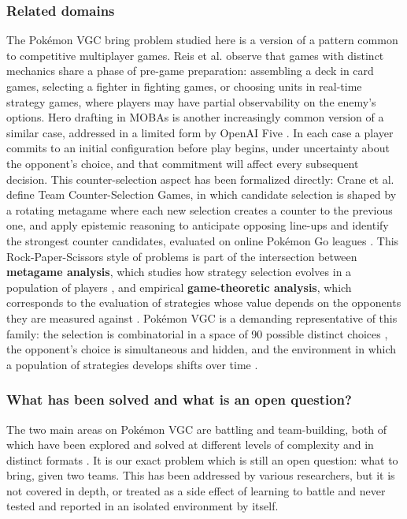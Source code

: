 \documentclass[conference]{IEEEtran}
\begin{document}
\subsubsection{Related domains}
The Pokémon VGC bring problem studied here is a version of a pattern common to
competitive multiplayer games. Reis et al. observe that games with distinct
mechanics share a phase of pre-game preparation: assembling a deck
in card games, selecting a fighter in fighting games, or choosing
units in real-time strategy games, \cite{reis2021} where players may have partial observability on the enemy's options. Hero drafting in MOBAs is another increasingly common version of a similar case, addressed in a limited form by OpenAI Five
\cite{angliss2026}. In each case a player commits to an initial configuration before
play begins, under uncertainty about the opponent's choice, and that commitment
will affect every subsequent decision. This counter-selection aspect has been
formalized directly: Crane et al. define Team Counter-Selection Games, in which
candidate selection is shaped by a rotating metagame where each new selection
creates a counter to the previous one, and apply epistemic reasoning to
anticipate opposing line-ups and identify the strongest counter candidates,
evaluated on online Pok\'emon Go leagues \cite{crane2021}. This Rock-Paper-Scissors style of problems is part of the intersection between \textbf{metagame analysis}, which studies how strategy selection evolves in a population of players \cite{reis2024}, and
empirical \textbf{game-theoretic analysis}, which corresponds to the evaluation of strategies
whose value depends on the opponents they are measured against
\cite{liwellman2024}. Pok\'emon VGC is a demanding representative of this
family: the selection is combinatorial in a space of 90 possible distinct choices \cite{angliss2026}, the opponent's choice is simultaneous
and hidden, and the environment in which a population of strategies develops shifts over time \cite{hu2024, karten2026}.
\subsubsection{What has been solved and what is an open question?}
The two main areas on Pokémon VGC  are battling and team-building, both of which have been explored and solved at different levels of complexity and in distinct formats \cite{simoes2020,huang2019,grigsby2025,karten2026}. It is our exact problem which is still an open question: what to bring, given two teams. This has been addressed by various researchers, but it is not covered in depth, \cite{rodriguez2024, reis2021} or treated as a side effect of learning to battle \cite{angliss2026} and never tested and reported in an isolated environment by itself.  
\end{document}
